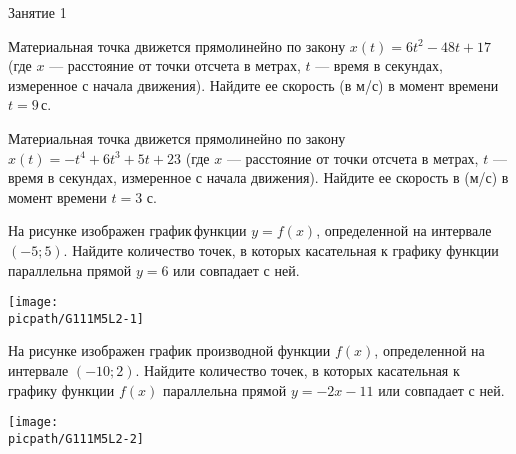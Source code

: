 %
%

\begin{class}[number=1]
	\begin{listofex}
		\item Занятие 1
	\end{listofex}
\end{class}

\begin{class}[number=2]
	\begin{listofex}
		\item Материальная точка движется прямолинейно по закону \(x(t) = 6t^2 - 48t + 17\) (где \(x\)  — расстояние от точки отсчета в метрах, \(t\)  — время в секундах, измеренное с начала движения). Найдите ее скорость (в м/с) в момент времени \(t  =  9\) с.
		\item Материальная точка движется прямолинейно по закону \(x(t) = -t^4 + 6t^3 + 5t + 23\) (где \(x\)  — расстояние от точки отсчета в метрах, \(t\)  — время в секундах, измеренное с начала движения). Найдите ее скорость в (м/с) в момент времени \(t = 3\) с.
		\item
		\begin{minipage}[t]{\bodywidth}
			На рисунке изображен график функции \( y = f(x)\), определенной на интервале \((-5; 5)\). Найдите количество точек, в которых касательная к графику функции параллельна прямой \(y  =  6\) или совпадает с ней.
		\end{minipage}
		\hspace{0.02\linewidth}
		\begin{minipage}[t]{\picwidth}
			\texttt{[image: \\picpath/G111M5L2-1]}
		\end{minipage}
		\item
		\begin{minipage}[t]{\bodywidth}
			На рисунке изображен график производной функции \(f(x)\), определенной на интервале \((-10; 2)\). Найдите количество точек, в которых касательная к графику функции \(f(x)\) параллельна прямой \(y = -2x - 11\) или совпадает с ней.
		\end{minipage}
		\hspace{0.02\linewidth}
		\begin{minipage}[t]{\picwidth}
			\texttt{[image: \\picpath/G111M5L2-2]}
		\end{minipage}

\end{listofex}
\end{class}
